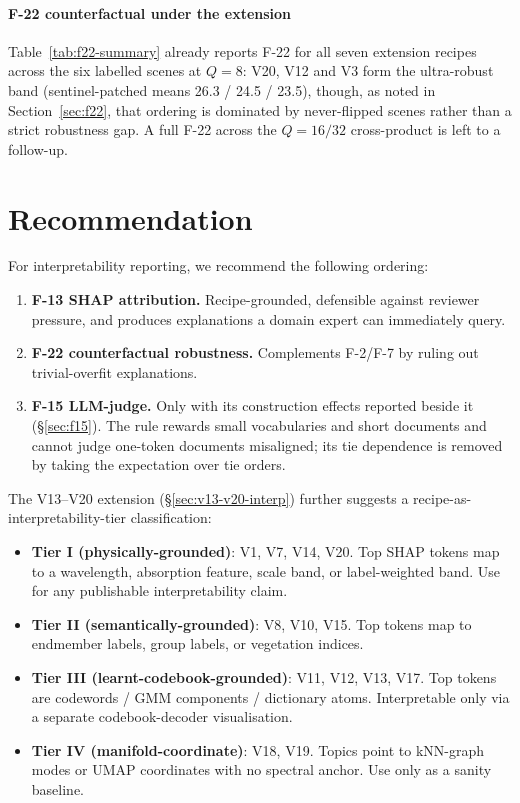 \documentclass[journal,a4paper,10pt]{IEEEtran}
\begin{document}
\paragraph{F-22 counterfactual under the extension}
Table~\ref{tab:f22-summary} already reports F-22 for all seven extension
recipes across the six labelled scenes at $Q=8$: V20, V12 and V3 form
the ultra-robust band (sentinel-patched means 26.3 / 24.5 / 23.5),
though, as noted in Section~\ref{sec:f22}, that ordering is dominated
by never-flipped scenes rather than a strict robustness gap. A full
F-22 across the $Q=16/32$ cross-product is left to a follow-up.

\section{Recommendation}\label{sec:rec}

For interpretability reporting, we recommend the following ordering:
\begin{enumerate}
  \item \textbf{F-13 SHAP attribution.} Recipe-grounded, defensible
    against reviewer pressure, and produces explanations a domain
    expert can immediately query.
  \item \textbf{F-22 counterfactual robustness.} Complements F-2/F-7
    by ruling out trivial-overfit explanations.
  \item \textbf{F-15 LLM-judge.} Only with its construction effects
    reported beside it (\S\ref{sec:f15}). The rule rewards small
    vocabularies and short documents and cannot judge one-token
    documents misaligned; its tie dependence is removed by taking the
    expectation over tie orders.
\end{enumerate}

The V13--V20 extension (\S\ref{sec:v13-v20-interp}) further suggests
a recipe-as-interpretability-tier classification:
\begin{itemize}
  \item \textbf{Tier I (physically-grounded)}: V1, V7, V14, V20.
    Top SHAP tokens map to a wavelength, absorption feature, scale
    band, or label-weighted band. Use for any publishable
    interpretability claim.
  \item \textbf{Tier II (semantically-grounded)}: V8, V10, V15.
    Top tokens map to endmember labels, group labels, or vegetation
    indices.
  \item \textbf{Tier III (learnt-codebook-grounded)}: V11, V12, V13,
    V17. Top tokens are codewords / GMM components / dictionary atoms.
    Interpretable only via a separate codebook-decoder visualisation.
  \item \textbf{Tier IV (manifold-coordinate)}: V18, V19. Topics point
    to kNN-graph modes or UMAP coordinates with no spectral anchor. Use
    only as a sanity baseline.
\end{itemize}
\end{document}
